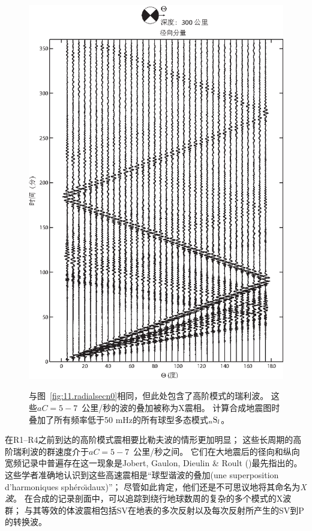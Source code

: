 \begin{figure}[!t]
\begin{center}
\scalebox{0.95}
{
\includegraphics{../figures/chap11/fig13.eps}
}
\end{center}
\caption[radial record section]{
\label{fig:11.radialsec}
与图~\ref{fig:11.radialsecn0}相同，但此处包含了高阶模式的瑞利波。
这些$aC=5\!-\!7$~公里/秒的波的叠加被称为X震相。
计算合成地震图时叠加了所有频率低于50 mHz的所有球型多态模式${}_n{\rm S}_l$。
}
\end{figure}
在R1--R4之前到达的高阶模式震相要比勒夫波的情形更加明显；
这些长周期的高阶瑞利波的群速度介于$aC=5\!-\!7$~公里/秒之间。
它们在大地震后的径向和纵向宽频记录中普遍存在这一现象是Jobert, Gaulon, Dieulin \& Roult (\citeyear{jobert&al77})最先指出的。
这些学者准确地认识到这些高速震相是“球型谐波的叠加(une superposition d'harmoniques sph\'{e}ro\"{\i}daux)”；
尽管如此肯定，他们还是不可思议地将其命名为{\em X波\/}。
%
在合成的记录剖面中，可以追踪到绕行地球数周的复杂的多个模式的X波群；
与其等效的体波震相包括SV在地表的多次反射以及每次反射所产生的SV到P的转换波。

